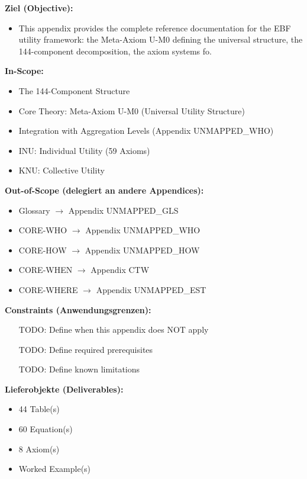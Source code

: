\begin{tcolorbox}[
    colback=orange!5!white,
    colframe=orange!75!black,
    title={\textbf{Appendix Scope: Ziel / In-Scope / Out-of-Scope / Constraints}},
    fonttitle=\bfseries
]

\textbf{Ziel (Objective):}
\begin{itemize}[nosep]
    \item This appendix provides the complete reference documentation for the EBF 
utility framework: the Meta-Axiom U-M0 defining the universal structure, 
the 144-component decomposition, the axiom systems fo.
\end{itemize}

\textbf{In-Scope:}
\begin{itemize}[nosep]
    \item The 144-Component Structure
    \item Core Theory: Meta-Axiom U-M0 (Universal Utility Structure)
    \item Integration with Aggregation Levels (Appendix UNMAPPED_WHO)
    \item INU: Individual Utility (59 Axioms)
    \item KNU: Collective Utility
\end{itemize}

\textbf{Out-of-Scope (delegiert an andere Appendices):}
\begin{itemize}[nosep]
    \item Glossary $\rightarrow$ Appendix UNMAPPED_GLS
    \item CORE-WHO $\rightarrow$ Appendix UNMAPPED_WHO
    \item CORE-HOW $\rightarrow$ Appendix UNMAPPED_HOW
    \item CORE-WHEN $\rightarrow$ Appendix CTW
    \item CORE-WHERE $\rightarrow$ Appendix UNMAPPED_EST
\end{itemize}

\textbf{Constraints (Anwendungsgrenzen):}
\begin{itemize}[nosep]
    \item [TODO: Define when this appendix does NOT apply]
    \item [TODO: Define required prerequisites]
    \item [TODO: Define known limitations]
\end{itemize}

\textbf{Lieferobjekte (Deliverables):}
\begin{itemize}[nosep]
    \item 44 Table(s)
    \item 60 Equation(s)
    \item 8 Axiom(s)
    \item Worked Example(s)
\end{itemize}

\end{tcolorbox}


